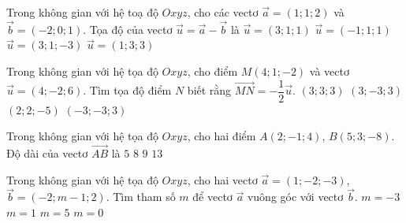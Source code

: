 \begin{ex}%
Trong không gian với hệ toạ độ $Oxyz$, cho các vectơ $\overrightarrow{a}=(1;1;2)$ và $\overrightarrow{b}=(-2;0;1)$. Tọa độ của vectơ $\overrightarrow{u}=\overrightarrow{a}-\overrightarrow{b}$ là
\choice
{\True $\overrightarrow{u}=(3;1;1)$}
{$\overrightarrow{u}=(-1;1;1)$}
{$\overrightarrow{u}=(3;1;-3)$}
{$\overrightarrow{u}=(1;3;3)$}
\end{ex}

\begin{ex}%
Trong không gian với hệ tọa độ $Oxyz$, cho điểm $M(4;1;-2)$ và vectơ $\overrightarrow{u}=(4;-2;6)$. Tìm tọa độ điểm $N$ biết rằng $\overrightarrow{MN}=-\dfrac{1}{2}\overrightarrow{u}$.
\choice
{$(3;3;3)$}
{$(3;-3;3)$}
{\True $(2;2;-5)$}
{$(-3;-3;3)$}
\end{ex}

\begin{ex}%
Trong không gian với hệ tọa độ $Oxyz$, cho hai điểm $A(2;-1;4)$, $B(5;3;-8)$. Độ dài của vectơ $\overrightarrow{AB}$ là
\choice
{$5$}
{$8$}
{$9$}
{\True $13$}
\end{ex}

\begin{ex}%
Trong không gian với hệ tọa độ $Oxyz$, cho hai vectơ $\overrightarrow{a}=(1;-2;-3)$, $\overrightarrow{b}=(-2;m-1;2)$. Tìm tham số $m$ để vectơ $\overrightarrow{a}$ vuông góc với vectơ $\overrightarrow{b}$.
\choice
{\True $m=-3$}
{$m=1$}
{$m=5$}
{$m=0$}
\end{ex}

